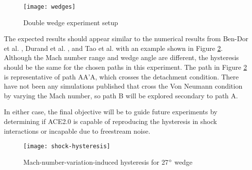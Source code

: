 \begin{figure}[ht!]
    \centering
    \texttt{[image: wedges]}
    \caption[Double wedge experiment setup]{Double wedge experiment setup \cite{mai-dis}}
    \label{fig:wedges}
\end{figure}

The expected results should appear similar to the numerical results from Ben-Dor et al. \cite{ben-dor-1}, Durand et al. \cite{durand}, and Tao et al. \cite{tao} with an example shown in Figure \ref{fig:shock-hysteresis}. Although the Mach number range and wedge angle are different, the hysteresis should be the same for the chosen paths in this experiment. The path in Figure \ref{fig:shock-hysteresis} is representative of path AA'A, which crosses the detachment condition. There have not been any simulations published that cross the Von Neumann condition by varying the Mach number, so path B will be explored secondary to path A.

In either case, the final objective will be to guide future experiments by determining if ACE2.0 is capable of reproducing the hysteresis in shock interactions or incapable due to freestream noise. 

\begin{figure}[ht!]
    \centering
    \texttt{[image: shock-hysteresis]}
    \caption[Mach-number-varitation-induced hysteresis for 27$\degree$ wedge]{Mach-number-variation-induced hysteresis for 27$\degree$ wedge \cite{ben-dor-1}}
    \label{fig:shock-hysteresis}
\end{figure}




